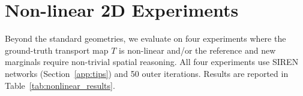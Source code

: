 \documentclass[11pt]{article}
\theoremstyle{definition}
\numberwithin{equation}{section}%
\begin{document}




% 
\section{Non-linear 2D Experiments}
\label{app:nonlinear}
% 

Beyond the standard geometries, we evaluate on four experiments where the
ground-truth transport map $T$ is non-linear and/or the reference and new
marginals require non-trivial spatial reasoning.
All four experiments use SIREN networks (Section~\ref{app:tips}) and 50
outer iterations.
Results are reported in Table~\ref{tab:nonlinear_results}.
\end{document}
